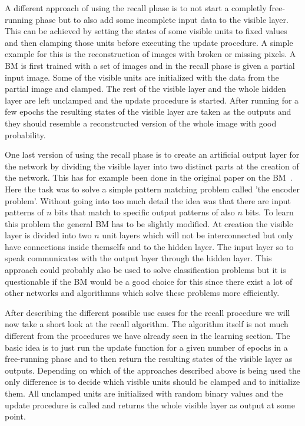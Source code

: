 \documentclass[12pt,twoside]{article}
\theoremstyle{plain}
\theoremstyle{definition}
\theoremstyle{remark}
\begin{document}
A different approach of using the recall phase is to not start a completly free-running phase but to also add some incomplete
input data to the visible layer. This can be achieved by setting the states of some visible units to fixed values and then 
clamping those units before executing the update procedure. A simple example for this is the reconstruction of images
with broken or missing pixels. A BM is first trained with a set of images and in the recall phase
is given a partial input image. Some of the visible units are initialized with the data from the partial image and clamped.
The rest of the visible layer and the whole hidden layer are left unclamped and the update procedure is started.
After running for a few epochs the resulting states of the visible layer are taken as the outputs and they should
resemble a reconstructed version of the whole image with good probability.

One last version of using the recall phase is to create an artificial output layer for the network by dividing the visible layer
into two distinct parts at the creation of the network. This has for example been done in the original paper on the BM~\cite{Ackley}. 
Here the task was to solve a simple pattern matching problem called 'the encoder problem'.
Without going into too much detail the idea was that there are input patterns of $n$ bits that match to specific output
patterns of also $n$ bits. To learn this problem the general BM has to be slightly modified.
At creation the visible layer is divided into two $n$ unit layers which will not be interconnected but only have 
connections inside themselfs and to the hidden layer. The input layer so to speak communicates with the output layer
through the hidden layer. This approach could probably also be used to solve classification problems but it
is questionable if the BM would be a good choice for this since there exist a lot of other 
networks and algorithmns which solve these problems more efficiently.\newline

After describing the different possible use cases for the recall procedure we will now take a short look at 
the recall algorithm. The algorithm itself is not much different from the 
procedures we have already seen in the learning section. The basic idea is to just run the update function
for a given number of epochs in a free-running phase and to then return the resulting states of the
visible layer as outputs. Depending on which of the approaches described above is being used the only
difference is to decide which visible units should be clamped and to initialize them. 
All unclamped units are initialized with random binary values and the update procedure is called 
and returns the whole visible layer as output at some point.
\end{document}
